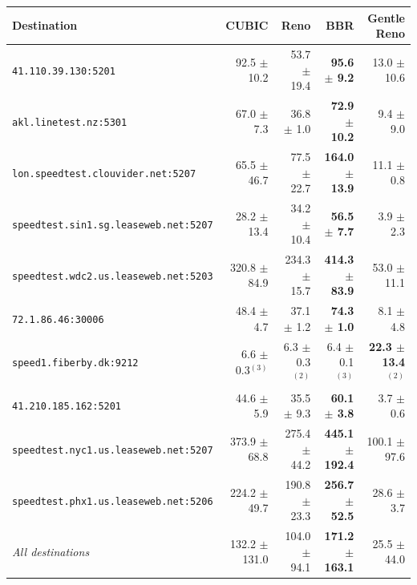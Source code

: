 \begin{tabular}{>{\raggedright\arraybackslash}p{5.4cm}rrrr}
\toprule
Destination & \textbf{CUBIC} & \textbf{Reno} & \textbf{BBR} & \textbf{Gentle Reno} \\
\midrule
\texttt{41.\allowbreak{}110.\allowbreak{}39.\allowbreak{}130:5201} & 92.5 $\pm$ 10.2 & 53.7 $\pm$ 19.4 & \textbf{95.6 $\pm$ 9.2} & 13.0 $\pm$ 10.6 \\
\texttt{akl.\allowbreak{}linetest.\allowbreak{}nz:5301} & 67.0 $\pm$ 7.3 & 36.8 $\pm$ 1.0 & \textbf{72.9 $\pm$ 10.2} & 9.4 $\pm$ 9.0 \\
\texttt{lon.\allowbreak{}speedtest.\allowbreak{}clouvider.\allowbreak{}net:5207} & 65.5 $\pm$ 46.7 & 77.5 $\pm$ 22.7 & \textbf{164.0 $\pm$ 13.9} & 11.1 $\pm$ 0.8 \\
\texttt{speedtest.\allowbreak{}sin1.\allowbreak{}sg.\allowbreak{}leaseweb.\allowbreak{}net:5207} & 28.2 $\pm$ 13.4 & 34.2 $\pm$ 10.4 & \textbf{56.5 $\pm$ 7.7} & 3.9 $\pm$ 2.3 \\
\texttt{speedtest.\allowbreak{}wdc2.\allowbreak{}us.\allowbreak{}leaseweb.\allowbreak{}net:5203} & 320.8 $\pm$ 84.9 & 234.3 $\pm$ 15.7 & \textbf{414.3 $\pm$ 83.9} & 53.0 $\pm$ 11.1 \\
\texttt{72.\allowbreak{}1.\allowbreak{}86.\allowbreak{}46:30006} & 48.4 $\pm$ 4.7 & 37.1 $\pm$ 1.2 & \textbf{74.3 $\pm$ 1.0} & 8.1 $\pm$ 4.8 \\
\texttt{speed1.\allowbreak{}fiberby.\allowbreak{}dk:9212} & 6.6 $\pm$ 0.3$^{(3)}$ & 6.3 $\pm$ 0.3$^{(2)}$ & 6.4 $\pm$ 0.1$^{(3)}$ & \textbf{22.3 $\pm$ 13.4$^{(2)}$} \\
\texttt{41.\allowbreak{}210.\allowbreak{}185.\allowbreak{}162:5201} & 44.6 $\pm$ 5.9 & 35.5 $\pm$ 9.3 & \textbf{60.1 $\pm$ 3.8} & 3.7 $\pm$ 0.6 \\
\texttt{speedtest.\allowbreak{}nyc1.\allowbreak{}us.\allowbreak{}leaseweb.\allowbreak{}net:5207} & 373.9 $\pm$ 68.8 & 275.4 $\pm$ 44.2 & \textbf{445.1 $\pm$ 192.4} & 100.1 $\pm$ 97.6 \\
\texttt{speedtest.\allowbreak{}phx1.\allowbreak{}us.\allowbreak{}leaseweb.\allowbreak{}net:5206} & 224.2 $\pm$ 49.7 & 190.8 $\pm$ 23.3 & \textbf{256.7 $\pm$ 52.5} & 28.6 $\pm$ 3.7 \\
\midrule
\textit{All destinations} & 132.2 $\pm$ 131.0 & 104.0 $\pm$ 94.1 & \textbf{171.2 $\pm$ 163.1} & 25.5 $\pm$ 44.0 \\
\bottomrule
\end{tabular}
